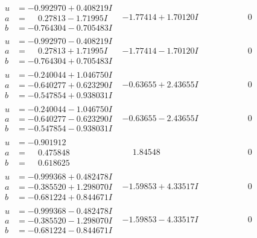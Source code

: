 \documentclass[1p]{elsarticle_modified}
\theoremstyle{definition}
\begin{document}
$$\begin{array}{c|c|c}
\begin{aligned}
u &= -0.992970 + 0.408219 I \\
a &= \phantom{-}0.27813 - 1.71995 I \\
b &= -0.764304 - 0.705483 I\end{aligned}
 & -1.77414 + 1.70120 I & \phantom{-0.000000 } 0 \\ \hline\begin{aligned}
u &= -0.992970 - 0.408219 I \\
a &= \phantom{-}0.27813 + 1.71995 I \\
b &= -0.764304 + 0.705483 I\end{aligned}
 & -1.77414 - 1.70120 I & \phantom{-0.000000 } 0 \\ \hline\begin{aligned}
u &= -0.240044 + 1.046750 I \\
a &= -0.640277 + 0.623290 I \\
b &= -0.547854 + 0.938031 I\end{aligned}
 & -0.63655 + 2.43655 I & \phantom{-0.000000 } 0 \\ \hline\begin{aligned}
u &= -0.240044 - 1.046750 I \\
a &= -0.640277 - 0.623290 I \\
b &= -0.547854 - 0.938031 I\end{aligned}
 & -0.63655 - 2.43655 I & \phantom{-0.000000 } 0 \\ \hline\begin{aligned}
u &= -0.901912\phantom{ +0.000000I} \\
a &= \phantom{-}0.475848\phantom{ +0.000000I} \\
b &= \phantom{-}0.618625\phantom{ +0.000000I}\end{aligned}
 & \phantom{-}1.84548\phantom{ +0.000000I} & \phantom{-0.000000 } 0 \\ \hline\begin{aligned}
u &= -0.999368 + 0.482478 I \\
a &= -0.385520 + 1.298070 I \\
b &= -0.681224 + 0.844671 I\end{aligned}
 & -1.59853 + 4.33517 I & \phantom{-0.000000 } 0 \\ \hline\begin{aligned}
u &= -0.999368 - 0.482478 I \\
a &= -0.385520 - 1.298070 I \\
b &= -0.681224 - 0.844671 I\end{aligned}
 & -1.59853 - 4.33517 I & \phantom{-0.000000 } 0 \\ \hline\begin{aligned}

\end{aligned}
\end{array}$$
\end{document}
